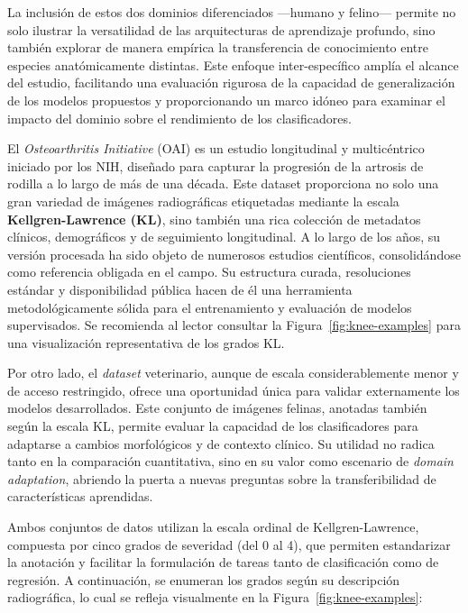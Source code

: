 \documentclass[11pt,spanish,listoffigures,listoftables]{tfgetsinf}
\begin{document}
La inclusión de estos dos dominios diferenciados —humano y felino— permite no solo ilustrar la versatilidad de las arquitecturas de aprendizaje profundo, sino también explorar de manera empírica la transferencia de conocimiento entre especies anatómicamente distintas. Este enfoque inter-específico amplía el alcance del estudio, facilitando una evaluación rigurosa de la capacidad de generalización de los modelos propuestos y proporcionando un marco idóneo para examinar el impacto del dominio sobre el rendimiento de los clasificadores.

    
El \textit{Osteoarthritis Initiative} (OAI) es un estudio longitudinal y multicéntrico iniciado por los NIH, diseñado para capturar la progresión de la artrosis de rodilla a lo largo de más de una década. Este dataset proporciona no solo una gran variedad de imágenes radiográficas etiquetadas mediante la escala \textbf{Kellgren-Lawrence (KL)}, sino también una rica colección de metadatos clínicos, demográficos y de seguimiento longitudinal. A lo largo de los años, su versión procesada ha sido objeto de numerosos estudios científicos, consolidándose como referencia obligada en el campo. Su estructura curada, resoluciones estándar y disponibilidad pública hacen de él una herramienta metodológicamente sólida para el entrenamiento y evaluación de modelos supervisados. Se recomienda al lector consultar la Figura~\ref{fig:knee-examples} para una visualización representativa de los grados KL.

Por otro lado, el \textit{dataset} veterinario, aunque de escala considerablemente menor y de acceso restringido, ofrece una oportunidad única para validar externamente los modelos desarrollados. Este conjunto de imágenes felinas, anotadas también según la escala KL, permite evaluar la capacidad de los clasificadores para adaptarse a cambios morfológicos y de contexto clínico. Su utilidad no radica tanto en la comparación cuantitativa, sino en su valor como escenario de \textit{domain adaptation}, abriendo la puerta a nuevas preguntas sobre la transferibilidad de características aprendidas.

Ambos conjuntos de datos utilizan la escala ordinal de Kellgren-Lawrence, compuesta por cinco grados de severidad (del 0 al 4), que permiten estandarizar la anotación y facilitar la formulación de tareas tanto de clasificación como de regresión. A continuación, se enumeran los grados según su descripción radiográfica, lo cual se refleja visualmente en la Figura~\ref{fig:knee-examples}:
\end{document}
